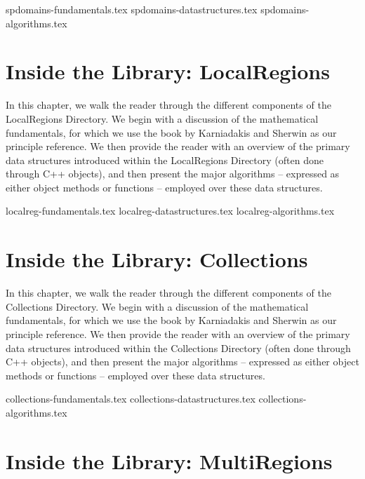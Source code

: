 {spdomains-fundamentals.tex}
%
{spdomains-datastructures.tex}
%
{spdomains-algorithms.tex}


\chapter{Inside the Library: LocalRegions}
\label{chap:localregions}


In this chapter, we walk the reader through the different components
of the LocalRegions Directory.  We begin with a discussion of the
mathematical fundamentals, for which we use the book by Karniadakis
and Sherwin \cite{KaSh05} as our principle reference.  We then provide
the reader with an overview of the primary data structures introduced
within the LocalRegions Directory (often done through C++ objects),
and then present the major algorithms -- expressed as either object
methods or functions -- employed over these data structures.

{localreg-fundamentals.tex}
%
{localreg-datastructures.tex}
%
{localreg-algorithms.tex}


\chapter{Inside the Library: Collections}

In this chapter, we walk the reader through the different components
of the Collections Directory.  We begin with a discussion of the
mathematical fundamentals, for which we use the book by Karniadakis
and Sherwin \cite{KaSh05} as our principle reference.  We then provide
the reader with an overview of the primary data structures introduced
within the Collections Directory (often done through C++ objects), and
then present the major algorithms -- expressed as either object
methods or functions -- employed over these data structures.

{collections-fundamentals.tex}
%
{collections-datastructures.tex}
%
{collections-algorithms.tex}


\chapter{Inside the Library: MultiRegions}
\label{chap:multiregions}


